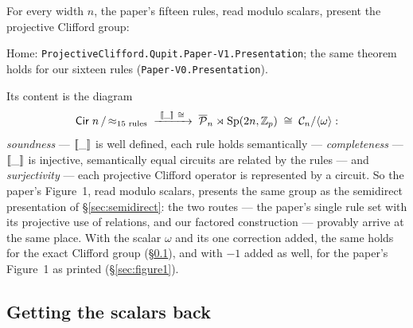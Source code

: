 \begin{theorem}\label{thm:main}
For every width $n$, the paper's fifteen rules, read modulo scalars,
present the projective Clifford group:
\begin{code}%
\>[0]\AgdaSpace{}%
\AgdaSymbol{:}\AgdaSpace{}%
\AgdaSpace{}%
\AgdaSpace{}%
\AgdaSpace{}%
\AgdaSymbol{(}\AgdaSpace{}%
\AgdaSymbol{)}\AgdaSpace{}%
\AgdaSpace{}%
\AgdaSymbol{(}\AgdaSpace{}%
\AgdaSymbol{)}\<%
\end{code}
\begin{code}[hide]%
\>[0]\AgdaSpace{}%
\AgdaSymbol{=}\AgdaSpace{}%
\<%
\end{code}
\noindent Home: \texttt{ProjectiveClifford.Qupit.Paper-V1.Presentation};
the same theorem holds for our sixteen rules
(\texttt{Paper-V0.Presentation}).
\end{theorem}

\noindent Its content is the diagram
\[
  \mathsf{Cir}\;n \,/\, {\approx_{\text{15 rules}}}
  \;\xrightarrow{\ [\![\_]\!]\ \cong\ }\;
  \overline{\mathcal{P}}_{n} \rtimes \mathrm{Sp}(2n,\mathbb{Z}_p) \;\cong\; \mathcal{C}_{n}/\langle\omega\rangle :
\]
\emph{soundness} --- $[\![\_]\!]$ is well defined, each rule holds
semantically --- \emph{completeness} --- $[\![\_]\!]$ is injective,
semantically equal circuits are related by the rules --- and
\emph{surjectivity} --- each projective Clifford operator is
represented by a circuit.  So the paper's
Figure~1, read modulo scalars, presents the same group as the
semidirect presentation of \S\ref{sec:semidirect}: the two routes ---
the paper's single rule set with its projective use of relations, and
our factored construction --- provably arrive at the same place.  With
the scalar $\omega$ and its one correction added, the same holds for
the exact Clifford group (\S\ref{sec:scalars}), and with $-1$ added as
well, for the paper's Figure~1 as printed (\S\ref{sec:figure1}).

\subsection{Getting the scalars back}\label{sec:scalars}

